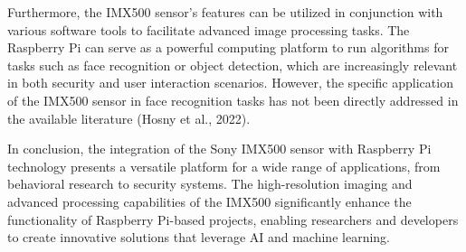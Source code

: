 \documentclass{article}
\begin{document}
Furthermore, the IMX500 sensor's features can be utilized in 
conjunction with various software tools to facilitate advanced 
image processing tasks. The Raspberry Pi can serve as a 
powerful computing platform to run algorithms for tasks 
such as face recognition or object detection, which are 
increasingly relevant in both security and user interaction 
scenarios. However, the specific application of the IMX500 
sensor in face recognition tasks has not been directly 
addressed in the available literature (Hosny et al., 2022).

In conclusion, the integration of the Sony IMX500 sensor 
with Raspberry Pi technology presents a versatile platform 
for a wide range of applications, from behavioral research 
to security systems. The high-resolution imaging and advanced 
processing capabilities of the IMX500 significantly enhance the 
functionality of Raspberry Pi-based projects, enabling 
researchers and developers to create innovative solutions 
that leverage AI and machine learning.
\end{document}

